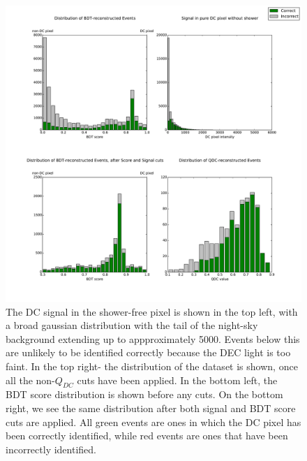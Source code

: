 \documentclass{article}
\begin{document}
\begin{figure}
\begin{center}
\includegraphics[width=\textwidth]{hess1statsbigtestdata}
\caption{The DC signal in the shower-free pixel is shown in the top left, with a broad gaussian distribution with the tail of the night-sky background extending up to appproximately 5000. Events below this are unlikely to be identified correctly because the DEC light is too faint. In the top right- the distribution of the dataset is shown, once all the non-$Q_{DC}$ cuts have been applied. In the bottom left, the BDT score distribution is shown before any cuts. On the bottom right, we see the same distribution after both signal and BDT score cuts are applied. All green events are ones in which the DC pixel has been correctly identified, while red events are ones that have been incorrectly identified.}
\label{fig:cutdistribution}
\end{center}
\end{figure}
\end{document}

